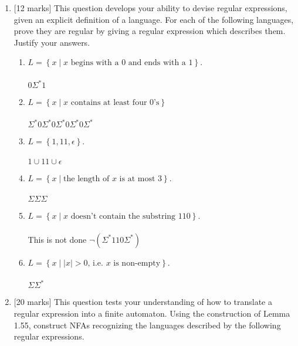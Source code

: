 \documentclass{article}
\newcommand{\set}[1]{{\left\{#1\right\}}}    %
\newcommand{\abs}[1]{\left\lvert #1 \right\rvert}
\begin{document}
\begin{enumerate}
    \item {[12 marks]} This question develops your ability to devise regular expressions, given an explicit definition of a language. For each of the following languages, prove they are regular by giving a regular expression which describes them. Justify your answers.
        \begin{enumerate}
            \item $L=\set{x\mid x \text{ begins with a $0$ and ends with a $1$}}$.\\
            \\
            $0\Sigma^*1$\\
            \item $L=\set{x\mid x \text{ contains at least four $0$'s}}$\\
            \\
            $\Sigma^*0\Sigma^*0\Sigma^*0\Sigma^*0\Sigma^*$\\
            \item $L=\set{1, 11, \epsilon}$.\\
            \\
            $1\cup11\cup\epsilon$\\
            \item $L=\set{x\mid \text{the length of $x$ is at most $3$}}$.\\
            \\
            $\Sigma\Sigma\Sigma$\\
            \item $L=\set{x\mid x \text{ doesn't contain the substring $110$}}$.\\
            \\
            This is not done $\neg(\Sigma^*110\Sigma^*)$\\
            \item $L=\set{x \mid \abs{x}>0 \text{, i.e. $x$ is non-empty}}$.\\
            \\
            $\Sigma\Sigma^*$\\
        \end{enumerate}
    \item {[20 marks]} This question tests your understanding of how to translate a regular expression into a finite automaton. Using the construction of Lemma 1.55, construct NFAs recognizing the languages described by the following regular expressions.
        \begin{enumerate}

\end{enumerate}
\end{enumerate}
\end{document}

